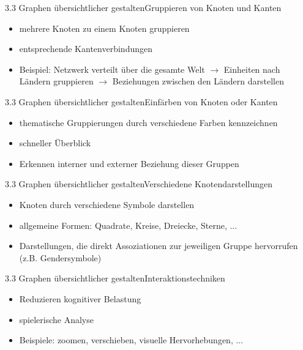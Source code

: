\documentclass[%
11pt,a4paper,xcolor={usenames,dvipsnames}]{beamer}
\begin{document}
	\begin{frame}{3.3 Graphen übersichtlicher gestalten}{Gruppieren von Knoten und Kanten}
        \begin{itemize}
            \item mehrere Knoten zu einem Knoten gruppieren
            \item entsprechende Kantenverbindungen
            \item Beispiel: Netzwerk verteilt über die gesamte Welt $\rightarrow$ Einheiten nach Ländern gruppieren $\rightarrow$ Beziehungen zwischen den Ländern darstellen
        \end{itemize}
    \end{frame}
    
    \begin{frame}{3.3 Graphen übersichtlicher gestalten}{Einfärben von Knoten oder Kanten}
        \begin{itemize}
            \item thematische Gruppierungen durch verschiedene Farben kennzeichnen
            \item schneller Überblick
            \item Erkennen interner und externer Beziehung dieser Gruppen
        \end{itemize}
    \end{frame}
    
    \begin{frame}{3.3 Graphen übersichtlicher gestalten}{Verschiedene Knotendarstellungen}
        \begin{itemize}
            \item Knoten durch verschiedene Symbole darstellen
            \item allgemeine Formen: Quadrate, Kreise, Dreiecke, Sterne, ...
            \item Darstellungen, die direkt Assoziationen zur jeweiligen Gruppe hervorrufen (z.B. Gendersymbole)
        \end{itemize}
    \end{frame}
    
    \begin{frame}{3.3 Graphen übersichtlicher gestalten}{Interaktionstechniken}
        \begin{itemize}
            \item Reduzieren kognitiver Belastung
            \item spielerische Analyse
            \item Beispiele: zoomen, verschieben, visuelle Hervorhebungen, ...
        \end{itemize}
    \end{frame}
    
\end{document}
